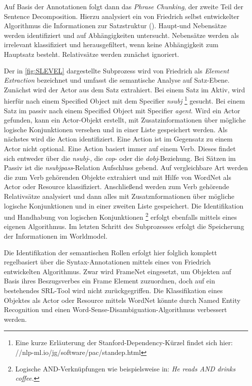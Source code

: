 Auf Basis der Annotationen folgt dann das \textit{Phrase Chunking}, der zweite Teil der Sentence Decomposition. Hierzu analysiert ein von Friedrich selbst entwickelter Algorithmus die Informationen zur Satzstruktur (\cite[vgl.][49]{FRIEDRICH2}). Haupt-und Nebensätze werden identifiziert und  auf Abhängigkeiten untersucht. Nebensätze werden als irrelevant klassifiziert und herausgefiltert, wenn keine Abhängigkeit zum Hauptsatz besteht. Relativsätze werden zunächst ignoriert.
\par
Der in \ref{fig:SLEVEL} dargestellte Subprozess wird von Friedrich als \textit{Element Extraction} bezeichnet und umfasst die semantische Analyse auf Satz-Ebene. Zunächst wird der Actor aus dem Satz extrahiert. Bei einem Satz im Aktiv, wird hierfür nach einem Specified Object mit dem Specifier \textit{nsubj} \footnote{Eine kurze Erläuterung der Stanford-Dependency-Kürzel findet sich hier: //nlp-ml.io/jg/software/pac/standep.html} gesucht. Bei einem Satz im passiv nach einem Specified Object mit Specifier \textit{agent}. Wird ein Actor gefunden, kann ein Actor-Objekt erstellt, mit Zusatzinformationen über mögliche logische Konjunktionen versehen und in einer Liste gespeichert werden. Als nächstes wird die Action identifiziert.  Eine Action ist im Gegensatz zu einem Actor nicht optional. Eine Action basiert immer auf einem Verb. Dieses findet sich entweder über die \textit{nsubj}-, die \textit{cop}- oder die \textit{dobj}-Beziehung. Bei Sätzen im Passiv ist die \textit{nsubjpass}-Relation Aufschluss gebend. Auf vergleichbare Art werden die zum Verb gehörenden Objekte extrahiert und mit Hilfe von WordNet als Actor oder Resource klassifiziert. Anschließend werden zum Verb gehörende Relativsätze analysiert und dann alles mit Zusatznformationen über mögliche logische Konjunktionen und in einer zweiten Liste gespeichert. Die Identifikation und Handhabung von logischen Konjunktionen \footnote{Logische AND-Verknüpfungen wie beispielsweise in: \textit{He reads AND drinks coffee.}} erfolgt ebenfalls mittels eines eigenen Algorithmus. Im letzten Schritt des Subprozesses erfolgt die Speicherung der Informationen im Worldmodel.
\par
Die Identifikation der semantischen Rollen erfolgt hier folglich komplett regelbasiert über die Syntax-Annotationen mittels eines von Friedrich entwickelten Algorithmus. Zwar wird FrameNet eingesetzt, um Objekten auf Basis ihres Beszugsverbes ein Frame Element zuzuordnen, doch auf ein bestehendes \ac{SRL}-Tool wird nicht zurückgegriffen. Die Klassifikation eines Objektes als Actor oder Resource mittels WordNet könnte durch Named Entity Recognition und einen Word-Sense-Disambiguation-Algorithmus verbessert werden.


